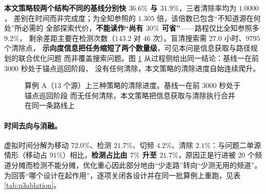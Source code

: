 \documentclass[withoutpreface, bwprint]{cumcmthesis}
\newcommand{\datadir}{../results}
\begin{document}
\textbf{本文策略较两个结构不同的基线分别快 $36.6\%$ 与 $31.9\%$}，三者清除率均为 $1.0000$，
差别在时间而非完成度；为全知参照的 $1.305$ 倍，该倍数已包含“不知道源在何处”所必需的
全部探索代价，\textbf{不能读作“尚有 $30\%$ 可省”}——路程仅比全知参照多 $9.2\%$，
剩余差距主要在检测次数（$143.2$ 对 $46$ 次）。盲清搜索需 $27.0$ 小时、$9795$ 个清除点，
\textbf{示向度信息把任务缩短了两个数量级}，可见本问是信息获取与路径规划的联合优化问题
而非覆盖搜索问题。图 \ref{fig:p3progress} 从过程侧给出同一结论：基线一在前 $3000$ 秒处于锚点巡回阶段、
没有任何清除，本文策略的清除进度自始连续爬升。

\begin{figure}[H]
  \centering
  \caption{算例 A（$13$ 个源）上三种策略的清除进度。基线一在前 $3000$ 秒处于锚点巡回阶段
    而无任何清除，本文策略把信息获取与清除执行合并在同一条路线上}
  \label{fig:p3progress}
\end{figure}

\paragraph{时间去向与消融。}
虚拟时间分解为移动 $72.0\%$、检测 $21.7\%$、切频 $4.2\%$、清除 $2.1\%$：与问题二单源
情形（移动占 $91\%$）相比，\textbf{检测占比由 $7\%$ 升至 $21.7\%$}，原因正是行进被
$20$ 个频道分摊而检测不能分摊，优化重心因此部分地由“少走路”转向“少测无用的频道”。
为回答“哪个设计在起作用”，逐项关闭各设计并在同一批算例上重跑，见表 \ref{tab:p3ablation}。
\end{document}
